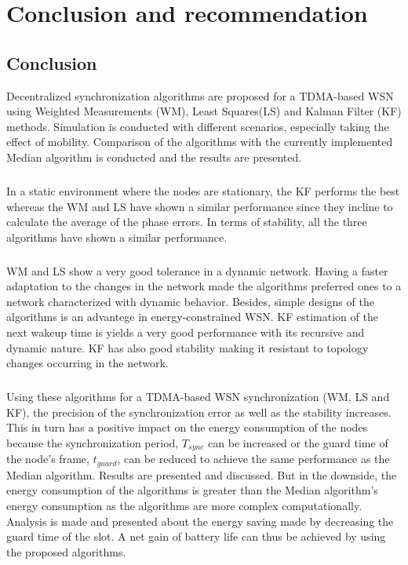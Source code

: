 \documentclass[a4paper,10pt]{report}
\begin{document}
\chapter{\textbf{Conclusion and recommendation}}
\section{\textbf{Conclusion}}
Decentralized synchronization algorithms are proposed for a
TDMA-based WSN using Weighted Measurements (WM), Least Squares(LS)
and Kalman Filter (KF) methods. Simulation is conducted with
different scenarios, especially taking the effect of mobility.
Comparison of the algorithms with the currently implemented Median
algorithm is conducted and the results are presented.
\paragraph*{}
In a static environment where the nodes are stationary, the KF
performs the best whereas the WM and LS have shown a similar
performance since they incline to calculate the average of the phase
errors. In terms of stability, all the three algorithms have shown a
similar performance.
\paragraph*{}
WM and LS show a very good tolerance in a dynamic network. Having a
faster adaptation to the changes in the network made the algorithms
preferred ones to a network characterized with dynamic behavior.
Besides, simple designs of the algorithms is an advantege in
energy-constrained WSN. KF estimation of the next wakeup time is
yields a very good performance with its recursive and dynamic
nature. KF has also good stability making it resistant to topology
changes occurring in the network.
\paragraph*{}
Using these algorithms for a TDMA-based WSN synchronization (WM, LS
and KF), the precision of the synchronization error as well as the
stability increases. This in turn has a positive impact on the
energy consumption of the nodes because the synchronization period,
$T_{sync}$ can be increased or the guard time of the node's frame,
$t_{guard}$, can be reduced to achieve the same performance as the
Median algorithm. Results are presented and discussed. But in the
downside, the energy consumption of the algorithms is greater than
the Median algorithm's energy consumption as the algorithms are more
complex computationally. Analysis is made and presented about the
energy saving made by decreasing the guard time of the slot. A net
gain of battery life can thus be achieved by using the proposed
algorithms.
\end{document}
